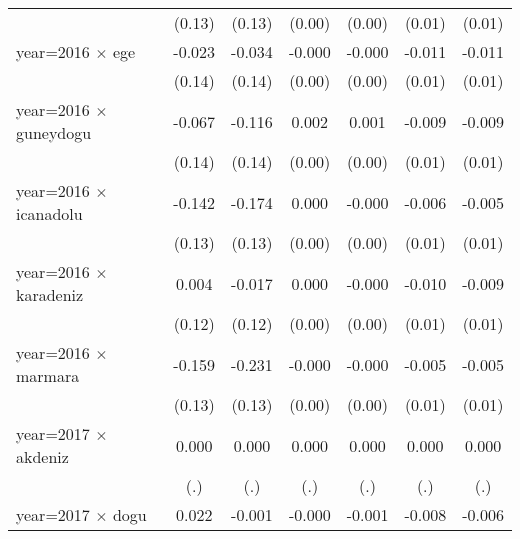 {\begin{tabular}{l*{6}{c}}
                    &      (0.13)         &      (0.13)         &      (0.00)         &      (0.00)         &      (0.01)         &      (0.01)         \\
year=2016 $\times$ ege&      -0.023         &      -0.034         &      -0.000         &      -0.000         &      -0.011         &      -0.011         \\
                    &      (0.14)         &      (0.14)         &      (0.00)         &      (0.00)         &      (0.01)         &      (0.01)         \\
year=2016 $\times$ guneydogu&      -0.067         &      -0.116         &       0.002         &       0.001         &      -0.009         &      -0.009         \\
                    &      (0.14)         &      (0.14)         &      (0.00)         &      (0.00)         &      (0.01)         &      (0.01)         \\
year=2016 $\times$ icanadolu&      -0.142         &      -0.174         &       0.000         &      -0.000         &      -0.006         &      -0.005         \\
                    &      (0.13)         &      (0.13)         &      (0.00)         &      (0.00)         &      (0.01)         &      (0.01)         \\
year=2016 $\times$ karadeniz&       0.004         &      -0.017         &       0.000         &      -0.000         &      -0.010         &      -0.009         \\
                    &      (0.12)         &      (0.12)         &      (0.00)         &      (0.00)         &      (0.01)         &      (0.01)         \\
year=2016 $\times$ marmara&      -0.159         &      -0.231         &      -0.000         &      -0.000         &      -0.005         &      -0.005         \\
                    &      (0.13)         &      (0.13)         &      (0.00)         &      (0.00)         &      (0.01)         &      (0.01)         \\
year=2017 $\times$ akdeniz&       0.000         &       0.000         &       0.000         &       0.000         &       0.000         &       0.000         \\
                    &         (.)         &         (.)         &         (.)         &         (.)         &         (.)         &         (.)         \\
year=2017 $\times$ dogu&       0.022         &      -0.001         &      -0.000         &      -0.001         &      -0.008         &      -0.006         \\

\end{tabular}}

